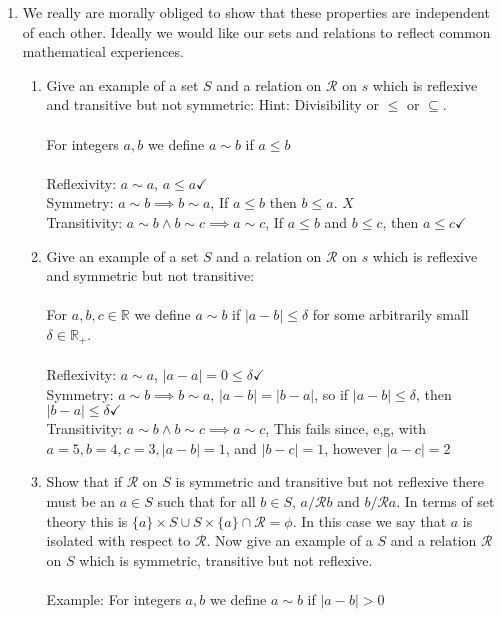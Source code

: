 \documentclass[11pt]{article}
\begin{document}
\begin{enumerate}
\newpage %
\item We really are morally obliged to show that these properties are independent of each other. Ideally we would like our sets and relations to reflect common mathematical experiences.
\begin{enumerate}
\item Give an example of a set $S$ and a relation on $\mathcal{R}$ on $s$ which is reflexive and transitive but not symmetric: Hint: Divisibility or $\leq$ or $\subseteq$.
\\
\\
For integers $a, b$ we define $a \sim b$ if $a \leq b$\\
\\Reflexivity: $a \sim a$, $a \leq a \checkmark$
\\Symmetry: $a \sim b \implies b \sim a$, If $a \leq b$ then $b \leq a$. $X$ 
\\Transitivity: $a \sim b \wedge b \sim c \implies a \sim c$, If $a \leq b$ and $b \leq c$, then $a \leq c \checkmark$
\\
\item Give an example of a set $S$ and a relation on $\mathcal{R}$ on $s$ which is reflexive and symmetric but not transitive:\\
\\
For $a,b,c \in \mathbb{R}$ we define $a \sim b$ if $|a - b| \leq \delta$ for some arbitrarily small $\delta \in \mathbb{R}_+$.
\\
\\Reflexivity: $a \sim a$, $|a-a| = 0 \leq \delta \checkmark$
\\Symmetry: $a \sim b \implies b \sim a$, $|a-b| = |b-a|$, so if $|a-b| \leq \delta$, then $|b-a| \leq \delta  \checkmark$
\\Transitivity: $a \sim b \wedge b \sim c \implies a \sim c$, This fails since, e,g, with $a = 5, b = 4, c = 3, |a-b| = 1$, and $|b-c| = 1$, however $|a-c| = 2$
\item Show that if $\mathcal{R}$ on $S$ is symmetric and transitive but not reflexive there must be an $a \in S$ such that for all $b \in S$, $a /\mathcal{R} b$ and $b  /\mathcal{R} a$. In terms of set theory this is $\{a\} \times S \cup S \times \{a\} \cap \mathcal{R} = \phi$. In this case we say that $a$ is isolated with respect to $\mathcal{R}$. Now give an example of a $S$ and a relation $\mathcal{R}$ on $S$ which is symmetric, transitive but not reflexive.
\\
\\
Example: For integers $a,b$ we define $a \sim b$ if $|a-b| > 0$
\end{enumerate}


\end{enumerate}
\end{document}
